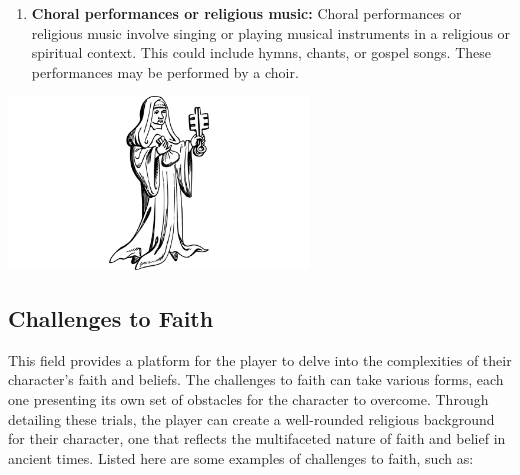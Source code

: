\documentclass[12pt]{book}
\begin{document}
\begin{enumerate}
    \item \textbf{Choral performances or religious music:}
    Choral performances or religious music involve singing or playing musical instruments in a religious or spiritual context. This could include hymns, chants, or gospel songs. These performances may be performed by a choir.
    
\end{enumerate}

\begin{center}
    \includegraphics[width=0.6\textwidth]{./images/religion05.pdf}
\end{center}

\subsection{\textbf{Challenges to Faith}}

This field provides a platform for the player to delve into the complexities of their character's faith and beliefs. The challenges to faith can take various forms, each one presenting its own set of obstacles for the character to overcome. Through detailing these trials, the player can create a well-rounded religious background for their character, one that reflects the multifaceted nature of faith and belief in ancient times. Listed here are some examples of challenges to faith, such as:
\end{document}
